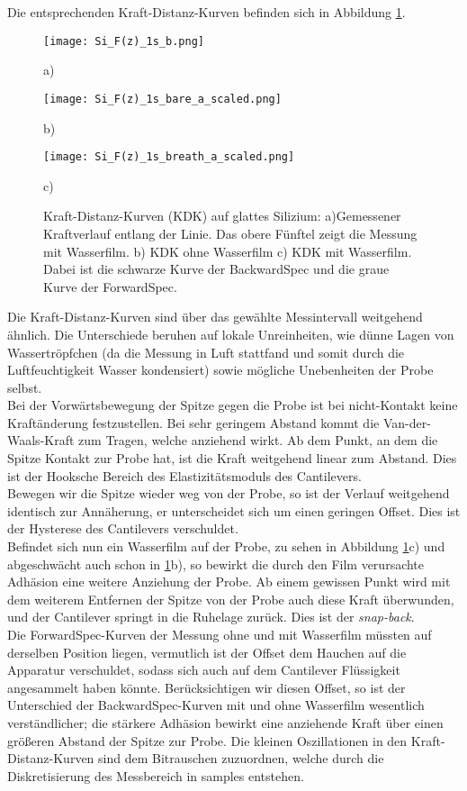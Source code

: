 Die entsprechenden Kraft-Distanz-Kurven befinden sich in Abbildung \ref{fig:Si_force-distance}.
\begin{figure}[h]
\centering
	\begin{minipage}{0.3\textwidth}
		\texttt{[image: Si\_F(z)\_1s\_b.png]}
		\caption{a)}
	\end{minipage}
	\hfill
	\begin{minipage}{0.3\textwidth}
		\texttt{[image: Si\_F(z)\_1s\_bare\_a\_scaled.png]}
		\caption{b)}
	\end{minipage}
	\hfill
	\begin{minipage}{0.3\textwidth}
		\texttt{[image: Si\_F(z)\_1s\_breath\_a\_scaled.png]}
		\caption{c)}
	\end{minipage}
	\caption{Kraft-Distanz-Kurven (KDK) auf glattes Silizium: a)Gemessener Kraftverlauf entlang der Linie. Das obere Fünftel zeigt die Messung mit Wasserfilm. b) KDK ohne Wasserfilm c) KDK mit Wasserfilm. Dabei ist die schwarze Kurve der BackwardSpec und die graue Kurve der ForwardSpec.}
	\label{fig:Si_force-distance}
\end{figure}
Die Kraft-Distanz-Kurven sind über das gewählte Messintervall weitgehend ähnlich. Die Unterschiede beruhen auf lokale Unreinheiten, wie dünne Lagen von Wassertröpfchen (da die Messung in Luft stattfand und somit durch die Luftfeuchtigkeit Wasser kondensiert) sowie mögliche Unebenheiten der Probe selbst.\\ 
Bei der Vorwärtsbewegung der Spitze gegen die Probe ist bei nicht-Kontakt keine Kraftänderung festzustellen. Bei sehr geringem Abstand kommt die Van-der-Waals-Kraft zum Tragen, welche anziehend wirkt. Ab dem Punkt, an dem die Spitze Kontakt zur Probe hat, ist die Kraft weitgehend linear zum Abstand. Dies ist der Hooksche Bereich des Elastizitätsmoduls des Cantilevers.\\
Bewegen wir die Spitze wieder weg von der Probe, so ist der Verlauf weitgehend identisch zur Annäherung, er unterscheidet sich um einen geringen Offset. Dies ist der Hysterese des Cantilevers verschuldet.\\
Befindet sich nun ein Wasserfilm auf der Probe, zu sehen in Abbildung \ref{fig:Si_force-distance}c) und abgeschwächt auch schon in \ref{fig:Si_force-distance}b), so bewirkt die durch den Film verursachte Adhäsion eine weitere Anziehung der Probe. Ab einem gewissen Punkt wird mit dem weiterem Entfernen der Spitze von der Probe auch diese Kraft überwunden, und der Cantilever springt in die Ruhelage zurück. Dies ist der \emph{snap-back}.\\
Die ForwardSpec-Kurven der Messung ohne und mit Wasserfilm müssten auf derselben Position liegen, vermutlich ist der Offset dem Hauchen auf die Apparatur verschuldet, sodass sich auch auf dem Cantilever Flüssigkeit angesammelt haben könnte.
Berücksichtigen wir diesen Offset, so ist der Unterschied der BackwardSpec-Kurven mit und ohne Wasserfilm wesentlich verständlicher; die stärkere Adhäsion bewirkt eine anziehende Kraft über einen größeren Abstand der Spitze zur Probe.
Die kleinen Oszillationen in den Kraft-Distanz-Kurven sind dem Bitrauschen zuzuordnen, welche durch die Diskretisierung des Messbereich in samples entstehen.
